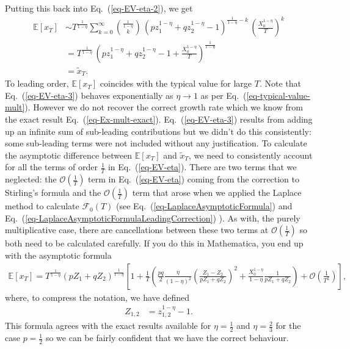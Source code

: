 \documentclass[11pt]{article}
\begin{document}
Putting this back into Eq.~(\ref{eq-EV-eta-2}), we get
\begin{align}
\nonumber \mathbb{E}\left[x_T \right] &\sim T^\frac{1}{1-\eta}   \sum_{k=0}^\infty {\frac{1}{1-\eta} \choose k}   \,\left( p z_1^{1-\eta} + q z_2^{1-\eta} -1\right)^{\frac{1}{1-\eta}-k}\,\left(\frac{X_0^{1-\eta}}{T}\right)^k \\
\label{eq-EV-eta-3} &=  T^\frac{1}{1-\eta} \, \left( p z_1^{1-\eta} + q z_2^{1-\eta} -1 + \frac{X_0^{1-\eta}}{T}\right)^\frac{1}{1-\eta} \\
\nonumber &= \widetilde{x}_T.
\end{align}
To leading order, $\mathbb{E}\left[x_T \right] $ coincides with the typical value for large $T$. Note that Eq.~(\ref{eq-EV-eta-3}) behaves exponentially as $\eta \to 1$ as per Eq.~(\ref{eq-typical-value-mult}). However we do not recover the correct growth rate which we know from the exact result Eq.~(\ref{eq-Ex-mult-exact}). Eq.~(\ref{eq-EV-eta-3}) results from adding up an infinite sum of sub-leading contributions but we didn't do this consistently: some sub-leading terms were not included without any justification. To calculate the asymptotic difference between $\mathbb{E}\left[x_T \right] $ and $ \widetilde{x}_T$, we need to consistently account for all the terms of order $\frac{1}{T}$ in Eq.~(\ref{eq-EV-eta}). There are two terms that we neglected: the $\mathcal{O}\left(\frac{1}{T}\right)$ term in Eq.~(\ref{eq-EV-eta}) coming from the correction to Stirling's formula and the $\mathcal{O}\left(\frac{1}{T}\right)$ term that arose when we applied the Laplace method to calculate $\mathcal{F}_0(T)$ (see Eq.~(\ref{eq-LaplaceAsymptoticFormula}) and Eq.~(\ref{eq-LaplaceAsymptoticFormulaLeadingCorrection}) ). As with, the purely multiplicative case, there are cancellations between these two terms at $\mathcal{O}\left(\frac{1}{T}\right)$ so both need to be calculated carefully. If you do this in Mathematica, you end up with the asymptotic formula
\begin{align*}
\mathbb{E}\left[x_T\right] = T^\frac{1}{1-\eta} \left( p Z_1 + q Z_2\right)^\frac{1}{1-\eta} \left[ 1+  
\frac{1}{T}\left( \frac{p q}{2}\frac{\eta}{(1-\eta)^2}\left(\frac{Z_1-Z_2}{pZ_1+q Z_2}\right)^2 + \frac{X_0^{1-\eta}}{1-\eta} \frac{1}{p Z_1+q Z_2}\right)
+ \mathcal{O}\left(\frac{1}{T^2}\right) \right],
\end{align*}
where, to compress the notation, we have defined
\begin{align*}
Z_{1,2} &= z_{1,2}^{1-\eta}-1.
\end{align*}
This formula agrees with the exact results available for $\eta = \frac{1}{2}$ and $\eta=\frac{2}{3}$ for the case $p=\frac{1}{2}$ so we can be fairly confident that we have the correct behaviour.
\end{document}
